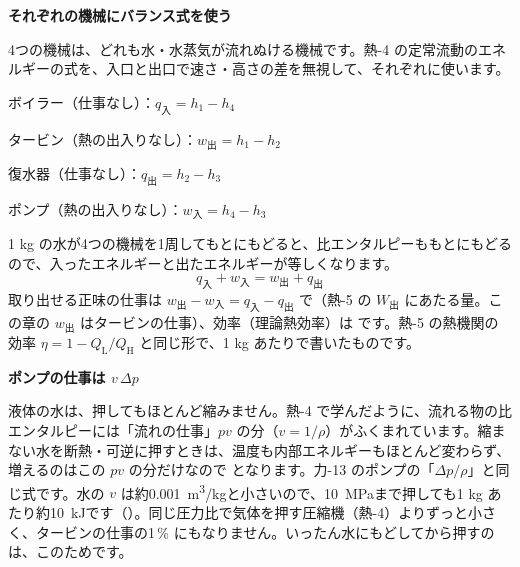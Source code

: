 \noindent\textbf{それぞれの機械にバランス式を使う}\par\nobreak
4つの機械は、どれも水・水蒸気が流れぬける機械です。熱-4 の定常流動のエネルギーの式を、入口と出口で速さ・高さの差を無視して、それぞれに使います。
\begin{phmodel}[理想のランキンサイクル]
\end{phmodel}
\begin{enumerate}[label={\bkcircled[bkBlue]{\arabic*}}, leftmargin=2.4\zw, itemsep=2pt, topsep=2pt]
\item ボイラー（仕事なし）：$q_{\text{入}}=h_1-h_4$
\item タービン（熱の出入りなし）：$w_{\text{出}}=h_1-h_2$
\item 復水器（仕事なし）：$q_{\text{出}}=h_2-h_3$
\item ポンプ（熱の出入りなし）：$w_{\text{入}}=h_4-h_3$
\end{enumerate}
1 kg の水が4つの機械を1周してもとにもどると、比エンタルピーももとにもどるので、入ったエネルギーと出たエネルギーが等しくなります。
\[ q_{\text{入}}+w_{\text{入}}=w_{\text{出}}+q_{\text{出}} \]
取り出せる正味の仕事は $w_{\text{出}}-w_{\text{入}}=q_{\text{入}}-q_{\text{出}}$ で（熱-5 の $W_{\text{出}}$ にあたる量。この章の $w_{\text{出}}$ はタービンの仕事）、効率（理論熱効率）は
です。\label{ph:熱-8:eta}熱-5 の熱機関の効率 $\eta=1-Q_{\mathrm L}/Q_{\mathrm H}$ と同じ形で、1 kg あたりで書いたものです。

\noindent\textbf{ポンプの仕事は $v\,\Delta p$}\par\nobreak
液体の水は、押してもほとんど縮みません。熱-4 で学んだように、流れる物の比エンタルピーには「流れの仕事」$pv$ の分（$v=1/\rho$）がふくまれています。縮まない水を断熱・可逆に押すときは、温度も内部エネルギーもほとんど変わらず、増えるのはこの $pv$ の分だけなので
となります。\label{ph:熱-8:pump}力-13 のポンプの「$\Delta p/\rho$」と同じ式です。水の $v$ は約\qty{0.001}{m^3/kg}と小さいので、\qty{10}{MPa}まで押しても1 kg あたり約\qty{10}{kJ}です（）。同じ圧力比で気体を押す圧縮機（熱-4）よりずっと小さく、タービンの仕事の1\,\% にもなりません。いったん水にもどしてから押すのは、このためです。
\begin{phflow}
\end{phflow}


